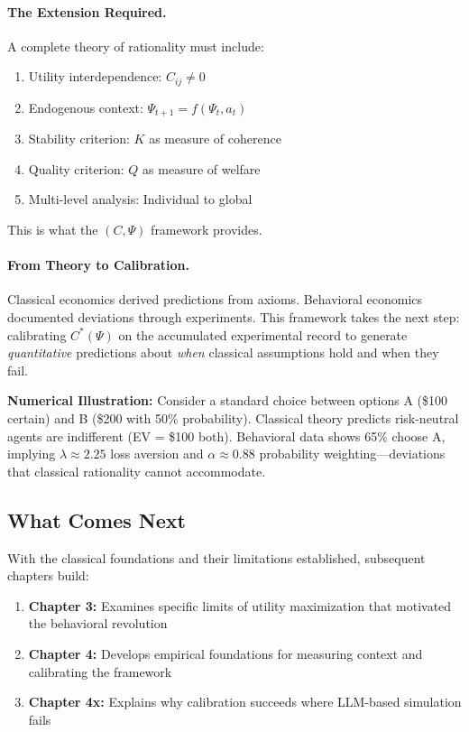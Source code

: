 \paragraph{The Extension Required.}
A complete theory of rationality must include:
\begin{enumerate}
  \item Utility interdependence: $C_{ij} \neq 0$
  \item Endogenous context: $\Psi_{t+1} = f(\Psi_t, a_t)$
  \item Stability criterion: $K$ as measure of coherence
  \item Quality criterion: $Q$ as measure of welfare
  \item Multi-level analysis: Individual to global
\end{enumerate}

This is what the $(C, \Psi)$ framework provides.

\paragraph{From Theory to Calibration.}
Classical economics derived predictions from axioms.
Behavioral economics documented deviations through experiments.
This framework takes the next step: calibrating $C^*(\Psi)$ on the accumulated
experimental record to generate \emph{quantitative} predictions about \emph{when}
classical assumptions hold and when they fail.

\textbf{Numerical Illustration:} Consider a standard choice between options A (\$100 certain) and B (\$200 with 50\% probability). Classical theory predicts risk-neutral agents are indifferent (EV = \$100 both). Behavioral data shows 65\% choose A, implying $\lambda \approx 2.25$ loss aversion and $\alpha \approx 0.88$ probability weighting---deviations that classical rationality cannot accommodate.

\subsection{What Comes Next}
\label{sec:ch2-next}

With the classical foundations and their limitations established, subsequent chapters build:

\begin{enumerate}[nosep]
    \item \textbf{Chapter 3:} Examines specific limits of utility maximization that motivated the behavioral revolution
    \item \textbf{Chapter 4:} Develops empirical foundations for measuring context and calibrating the framework
    \item \textbf{Chapter 4x:} Explains why calibration succeeds where LLM-based simulation fails
\end{enumerate}

